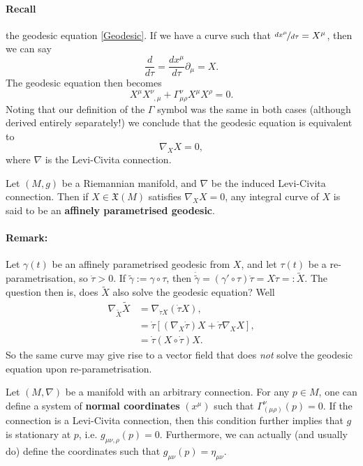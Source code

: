 \documentclass[11pt,fleqn]{report}
\begin{document}
\paragraph{Recall} the geodesic equation \eqref{Geodesic}. If we have a curve such that $\nicefrac{d x^\mu}{d\tau} = X^\mu$, then we can say
	\begin{equation}
		\frac{d}{d \tau} = \frac{dx^\mu}{d\tau}\partial_\mu = X.
	\end{equation}
The geodesic equation then becomes
	\begin{equation}
		X^\mu X^\nu_{\phantom v ,\mu} + \Gamma_{\mu\rho}^\nu X^\mu X^\rho = 0.
	\end{equation}
Noting that our definition of the $\Gamma$ symbol was the same in both cases (although derived entirely separately!) we conclude that the geodesic equation is equivalent to
	\begin{equation}\label{BetterGeodesic}
		\nabla_XX=0,
	\end{equation} where $\nabla$ is the Levi-Civita connection.

\begin{definition}
	Let $(M,g)$ be a Riemannian manifold, and $\nabla$ be the induced Levi-Civita connection. Then if $X\in\mathfrak{X}(M)$ satisfies $\nabla_XX=0$, any integral curve of $X$ is said to be an \textbf{affinely parametrised geodesic}.
\end{definition}

\paragraph{Remark:} Let $\gamma(t)$ be an affinely parametrised geodesic from $X$, and let $\tau(t)$ be a re-parametrisation, so $\dot{\tau}>0$. If $\tilde{\gamma}:=\gamma\circ\tau$, then $\dot{\tilde{\gamma}} = (\gamma'\circ\tau)\dot{\tau}=X\dot{\tau}=:\widetilde{X}$. The question then is, does $\widetilde{X}$ also solve the geodesic equation? Well
	\begin{align}
		\nabla_{\widetilde{X}}\widetilde{X} 
		&= \nabla_{\dot{\tau} X}(\dot{\tau} X),\\
		&= \dot{\tau}\left[(\nabla_X\dot{\tau})X + \dot{\tau}\nabla_XX\right], \\
		&= \dot{\tau}(X\circ\dot{\tau})X.	\label{re-param.}
	\end{align}
So the same curve may give rise to a vector field that does \textit{not} solve the geodesic equation upon re-parametrisation.

\begin{definition}
	Let $(M,\nabla)$ be a manifold with an arbitrary connection. For any $p \in M$, one can define a system of \textbf{normal coordinates} $(x^\mu)$ such that $\Gamma^\nu_{(\mu\rho)}(p)=0$.
	If the connection is a Levi-Civita connection, then this condition further implies that $g$ is stationary at $p$, i.e. $g_{\mu\nu,\rho}(p)=0$. Furthermore, we can actually (and usually do) define the coordinates such that $g_{\mu\nu}(p) = \eta_{\mu\nu}$.
\end{definition}
\end{document}
